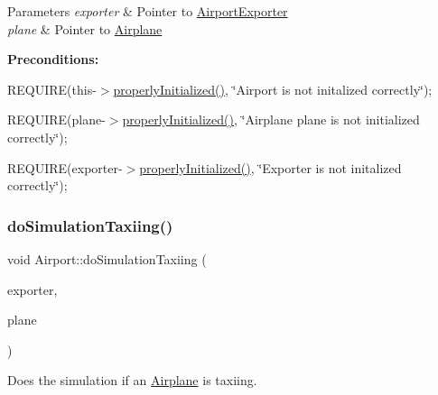 \begin{DoxyParams}{Parameters}
{\em exporter} & Pointer to \mbox{\hyperlink{class_airport_exporter}{Airport\+Exporter}} \\
\hline
{\em plane} & Pointer to \mbox{\hyperlink{class_airplane}{Airplane}}\\
\hline
\end{DoxyParams}
{\bfseries Preconditions\+:}
\begin{DoxyItemize}
\item R\+E\+Q\+U\+I\+RE(this-\/$>$\mbox{\hyperlink{class_airport_aa13e68ac58e8875837fbe888325cfff6}{properly\+Initialized()}}, \char`\"{}\+Airport is not initalized correctly\char`\"{});
\item R\+E\+Q\+U\+I\+RE(plane-\/$>$\mbox{\hyperlink{class_airport_aa13e68ac58e8875837fbe888325cfff6}{properly\+Initialized()}}, \char`\"{}\+Airplane \textquotesingle{}plane\textquotesingle{} is not initialized correctly\char`\"{});
\item R\+E\+Q\+U\+I\+RE(exporter-\/$>$\mbox{\hyperlink{class_airport_aa13e68ac58e8875837fbe888325cfff6}{properly\+Initialized()}}, \char`\"{}\+Exporter is not initalized correctly\char`\"{}); 
\end{DoxyItemize}\mbox{\label{class_airport_a473d89e33cae2358008a96652c2e68c2}} 
\subsubsection{\texorpdfstring{do\+Simulation\+Taxiing()}{doSimulationTaxiing()}}
{\footnotesize\ttfamily void Airport\+::do\+Simulation\+Taxiing (\begin{DoxyParamCaption}\item[{\mbox{\hyperlink{class_airport_exporter}{Airport\+Exporter}} $\ast$}]{exporter,  }\item[{\mbox{\hyperlink{class_airplane}{Airplane}} $\ast$}]{plane }\end{DoxyParamCaption})}



Does the simulation if an \mbox{\hyperlink{class_airplane}{Airplane}} is taxiing. 


